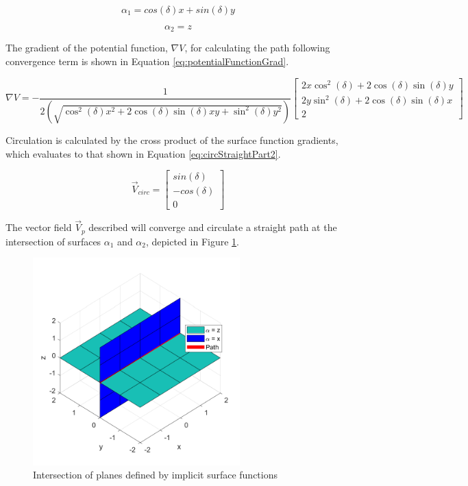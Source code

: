 \documentclass[numbered,pdftex]{ohio-etd}
\begin{document}
\begin{equation}
\label{eq:pathFunction}
\alpha_1 = cos(\delta)x + sin(\delta)y
\end{equation}

\begin{equation}
\label{eq:pathFunctionZ}
\alpha_2 = z
\end{equation}



\noindent
The gradient of the potential function, $\nabla V$, for calculating the path following convergence term is shown in Equation \ref{eq:potentialFunctionGrad}.

\begin{equation}
\label{eq:potentialFunctionGrad}
\nabla V = -\frac{1}{2(\sqrt{\cos^2(\delta) x^2+2\cos(\delta)\sin(\delta) xy +\sin^2 (\delta) y^2})} \begin{bmatrix}
2x\cos^2(\delta) + 2\cos(\delta)\sin(\delta) y \\
2y\sin^2(\delta) + 2\cos(\delta)\sin(\delta) x \\
2
\end{bmatrix}
\end{equation}

\noindent
Circulation is calculated by the cross product of the surface function gradients, which evaluates to that shown in Equation \ref{eq:circStraightPart2}.


\begin{equation}
\label{eq:circStraightPart2}
\overrightarrow{V}_{circ} = \begin{bmatrix}
sin(\delta) \\
-cos(\delta) \\
0
\end{bmatrix}
\end{equation}

The vector field $\overrightarrow{V}_p$ described will converge and circulate a straight path at the intersection of surfaces $\alpha_1$ and $\alpha_2$, depicted in Figure \ref{fig:planeIntersection}.

\begin{figure}[H]
	\centering
	\includegraphics[width=8cm]{Figures/planeIntersection}
	\caption{Intersection of planes defined by implicit surface functions}
	\label{fig:planeIntersection}
\end{figure}
\end{document}
